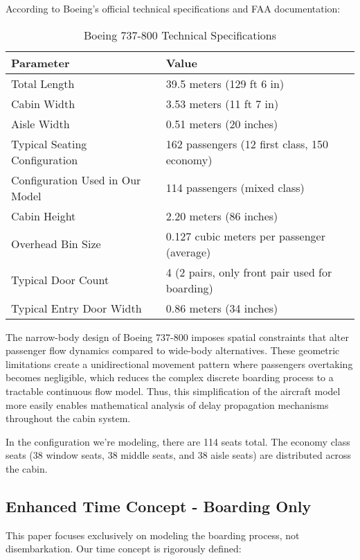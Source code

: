 \documentclass[12pt]{article}
\begin{document}
According to Boeing's official technical specifications and FAA documentation:

\begin{table}[H]
\centering
\caption{Boeing 737-800 Technical Specifications}
\begin{tabular}{ll}
\hline
\textbf{Parameter} & \textbf{Value} \\
\hline
Total Length & 39.5 meters (129 ft 6 in) \\
Cabin Width & 3.53 meters (11 ft 7 in) \\
Aisle Width & 0.51 meters (20 inches) \\
Typical Seating Configuration & 162 passengers (12 first class, 150 economy) \\
Configuration Used in Our Model & 114 passengers (mixed class) \\
Cabin Height & 2.20 meters (86 inches) \\
Overhead Bin Size & 0.127 cubic meters per passenger (average) \\
Typical Door Count & 4 (2 pairs, only front pair used for boarding) \\
Typical Entry Door Width & 0.86 meters (34 inches) \\
\hline
\end{tabular}
\end{table}

The narrow-body design of Boeing 737-800 imposes spatial constraints that alter passenger flow dynamics compared to wide-body alternatives. These geometric limitations create a unidirectional movement pattern where passengers overtaking becomes negligible, which reduces the complex discrete boarding process to a tractable continuous flow model. Thus, this simplification of the aircraft model more easily enables mathematical analysis of delay propagation mechanisms throughout the cabin system.

In the configuration we're modeling, there are 114 seats total. The economy class seats (38 window seats, 38 middle seats, and 38 aisle seats) are distributed across the cabin.

\subsection{Enhanced Time Concept - Boarding Only}

This paper focuses exclusively on modeling the boarding process, not disembarkation. Our time concept is rigorously defined:
\end{document}
